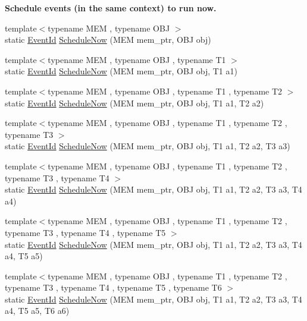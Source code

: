 \begin{Indent}{\bf Schedule events (in the same context) to run now.}\par
\begin{DoxyCompactItemize}
\item 
{\footnotesize template$<$typename M\+EM , typename O\+BJ $>$ }\\static \hyperlink{classns3_1_1EventId}{Event\+Id} \hyperlink{classns3_1_1Simulator_a2219ee02c0647adc83d1c918c3256266}{Schedule\+Now} (M\+EM mem\+\_\+ptr, O\+BJ obj)
\item 
{\footnotesize template$<$typename M\+EM , typename O\+BJ , typename T1 $>$ }\\static \hyperlink{classns3_1_1EventId}{Event\+Id} \hyperlink{classns3_1_1Simulator_aad79a4e146d288dbefffaad07ee003b7}{Schedule\+Now} (M\+EM mem\+\_\+ptr, O\+BJ obj, T1 a1)
\item 
{\footnotesize template$<$typename M\+EM , typename O\+BJ , typename T1 , typename T2 $>$ }\\static \hyperlink{classns3_1_1EventId}{Event\+Id} \hyperlink{classns3_1_1Simulator_ae336c12f9c1d9234b7541d2f966dc8ed}{Schedule\+Now} (M\+EM mem\+\_\+ptr, O\+BJ obj, T1 a1, T2 a2)
\item 
{\footnotesize template$<$typename M\+EM , typename O\+BJ , typename T1 , typename T2 , typename T3 $>$ }\\static \hyperlink{classns3_1_1EventId}{Event\+Id} \hyperlink{classns3_1_1Simulator_ad5e0f1f4a206d9996fb74f85d5ea6bb0}{Schedule\+Now} (M\+EM mem\+\_\+ptr, O\+BJ obj, T1 a1, T2 a2, T3 a3)
\item 
{\footnotesize template$<$typename M\+EM , typename O\+BJ , typename T1 , typename T2 , typename T3 , typename T4 $>$ }\\static \hyperlink{classns3_1_1EventId}{Event\+Id} \hyperlink{classns3_1_1Simulator_ace9dcf0c1d446b77fa85c69f13876052}{Schedule\+Now} (M\+EM mem\+\_\+ptr, O\+BJ obj, T1 a1, T2 a2, T3 a3, T4 a4)
\item 
{\footnotesize template$<$typename M\+EM , typename O\+BJ , typename T1 , typename T2 , typename T3 , typename T4 , typename T5 $>$ }\\static \hyperlink{classns3_1_1EventId}{Event\+Id} \hyperlink{classns3_1_1Simulator_a3d64ecd332c62755fa7b937340dcdec4}{Schedule\+Now} (M\+EM mem\+\_\+ptr, O\+BJ obj, T1 a1, T2 a2, T3 a3, T4 a4, T5 a5)
\item 
{\footnotesize template$<$typename M\+EM , typename O\+BJ , typename T1 , typename T2 , typename T3 , typename T4 , typename T5 , typename T6 $>$ }\\static \hyperlink{classns3_1_1EventId}{Event\+Id} \hyperlink{classns3_1_1Simulator_a6dacfbf73faec675a17b098e68f26b56}{Schedule\+Now} (M\+EM mem\+\_\+ptr, O\+BJ obj, T1 a1, T2 a2, T3 a3, T4 a4, T5 a5, T6 a6)

\end{DoxyCompactItemize}
\end{Indent}
